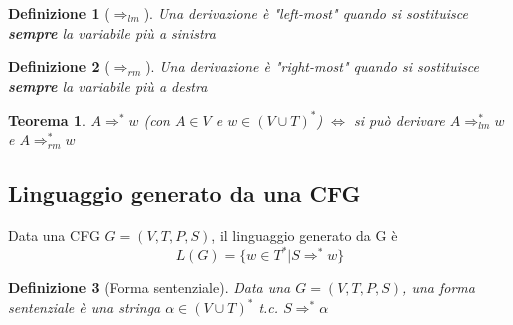 \documentclass[12pt]{article}
\newtheorem{Definizione}{Definizione}[subsection]
\newtheorem{Teorema}{Teorema}[subsection]
\begin{document}
\begin{Definizione}[$\Rightarrow_{lm}$]
Una derivazione è "left-most" quando si sostituisce \textbf{sempre} la variabile più a sinistra
\end{Definizione}
\begin{Definizione}[$\Rightarrow_{rm}$]
Una derivazione è "right-most" quando si sostituisce \textbf{sempre} la variabile più a destra
\end{Definizione}
\begin{Teorema}
$A \Rightarrow^* w$ (con $A\in V$ e $w \in (V \cup T)^*$) $\Leftrightarrow$ si può derivare $A \Rightarrow_{lm}^* w$ e $A \Rightarrow_{rm}^* w$
\end{Teorema}
\subsection{Linguaggio generato da una CFG}
Data una CFG $G = (V, T, P, S)$, il linguaggio generato da G è $$L(G) = \{w \in T^* | S \Rightarrow^* w \}$$
\begin{Definizione}[Forma sentenziale]
    Data una $G = (V, T, P, S)$, una forma sentenziale è una stringa $\alpha \in (V \cup T)^*$ t.c. $S \Rightarrow^* \alpha$
\end{Definizione}
\newpage
\end{document}
